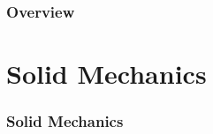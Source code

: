 \graphicspath{{figs}}
%
\begin{frame}[fragile]
\frametitle{Overview}
\tableofcontents
\end{frame}



\section{Solid Mechanics}
\begin{frame}[fragile]
\frametitle{Solid Mechanics}
\tableofcontents[current]
\end{frame}



\thanksframe

\Hide{
\begin{frame}
\frametitle{}
\structure{}
\begin{itemize}[<+->]
\item
\end{itemize}
\end{frame}
}


